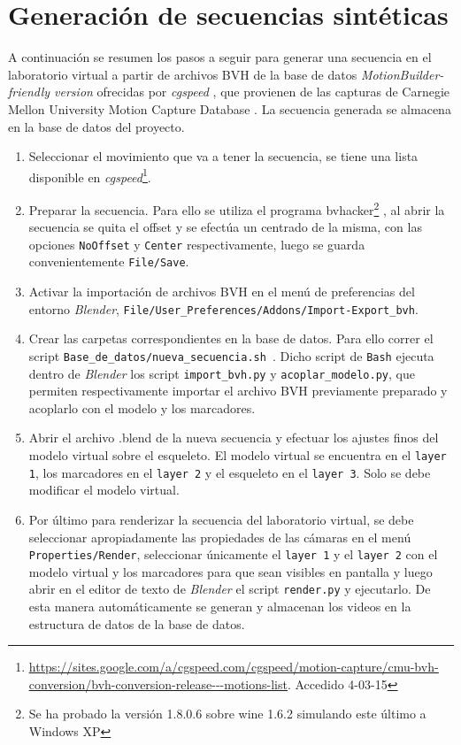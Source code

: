 \section{Generación de secuencias sintéticas}

A continuación se resumen los pasos a seguir para generar una secuencia en el laboratorio virtual a partir de archivos BVH de la base de datos \textit{MotionBuilder-friendly version} ofrecidas por \textit{cgspeed} \cite{cgspeed}, 
 que provienen de las capturas de Carnegie Mellon University Motion Capture Database \cite{CMU}. La secuencia generada se almacena en la base de datos del proyecto.
 
 \begin{enumerate}
 \item Seleccionar el movimiento que va a tener la secuencia, se tiene una  lista disponible en \textit{cgspeed}\footnote{{\tiny \textcolor{blue}{\underline{\url{https://sites.google.com/a/cgspeed.com/cgspeed/motion-capture/cmu-bvh-conversion/bvh-conversion-release---motions-list}}}}. Accedido 4-03-15}. 
 \item Preparar la secuencia. Para ello se utiliza el programa bvhacker\footnote{Se ha probado la versión 1.8.0.6 sobre wine 1.6.2 simulando este último a Windows XP} \cite{bvhacker}, al abrir la secuencia se quita el offset y se efectúa un centrado de la misma, con las opciones \texttt{NoOffset} y \texttt{Center} respectivamente, luego se guarda convenientemente \texttt{File/Save}.
 \item Activar la importación de archivos BVH en el menú de preferencias del entorno \textit{Blender}, \texttt{File/User\_Preferences/Addons/Import-Export\_bvh}.
 \item Crear las carpetas correspondientes en la base de datos. Para ello correr el script \texttt{Base\_de\_datos/nueva\_secuencia.sh }. Dicho script de \texttt{Bash} ejecuta dentro de \textit{Blender} los script \texttt{import\_bvh.py} y \texttt{acoplar\_modelo.py}, que permiten respectivamente importar el archivo BVH previamente preparado y acoplarlo con el modelo y los marcadores.
 \item Abrir el archivo .blend de la nueva secuencia  y efectuar los ajustes finos del modelo virtual sobre el esqueleto. El modelo virtual se encuentra en el \texttt{layer 1}, los marcadores en el \texttt{layer 2}  y el esqueleto en el \texttt{layer 3}. Solo se debe modificar el modelo virtual.
 \item Por último para renderizar la secuencia del laboratorio virtual, se debe seleccionar apropiadamente las propiedades de las cámaras en el menú\\ \texttt{Properties/Render}, seleccionar únicamente el \texttt{layer 1} y el \texttt{layer 2} con el modelo virtual y los marcadores para que sean  visibles en pantalla y luego abrir en el editor de texto de \textit{Blender} el script \texttt{render.py} y ejecutarlo. De esta manera automáticamente se generan y almacenan los videos en la estructura de datos de la base de datos.
 
 \end{enumerate}
 
